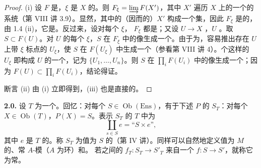\begin{proof}
(i) 设 $F$ 是，$\xi$ 是 $X$ 的。则 $F_\xi=\varinjlim F(X')$，其中 $X'$ 遍历 $X$ 上的一个的系统（第 VIII 讲 3.9）。显然，其中的（因而的）$X'$ 构成一个集，因此 $F_\xi$ 是的，由 1.4 (ii)，它是。反过来，设对每个 $\xi$， $F_\xi$ 都是；又设 $U\to X$ ，$U$ 。取 $S\subset F(U)$。对 $U$ 的每个 $\xi$，$S$ 在 $F_\xi$ 中的像生成一个。由于为，容易推出存在 $U$ 上带 $\xi$ 标点的 $U_\xi$，使 $S$ 在 $F(U_\xi)$ 中生成一个（参看第 VIII 讲 4）。个这样的 $U_\xi$ 即构成 $U$ 的一个，记为 $\{U_1,\ldots,U_n\}$。则 $S$ 在 $\prod_iF(U_i)$ 中的像生成一个；因为 $F(U)\subset\prod_iF(U_i)$，结论得证。

断言 (ii) 由 (i) 立即得到，(iii) 也是直接的。
\end{proof}
\textbf{2.0.} 设 $T$ 为一个。回忆：对每个 $S\in\operatorname{Ob}(\mathrm{Ens})$，有于下述 $P$ 的 $S_T$：对每个 $X\in\operatorname{Ob}(T)$，$P(X)=S$。表示 $S_T$ 的 $T$ 中为
\[
\coprod_{s\in S}e=\text{“}S\times e\text{”},
\]
其中 $e$ 是 $T$ 的。称 $S_T$ 为值为 $S$ 的（第 IV 讲）。同样可以自然地定义值为 $M$ 的、常 $A$-模（$A$ 为环）和。
若之间的 $f_T:S_T\to S'_T$ 来自一个 $f:S\to S'$，就称它为常。

